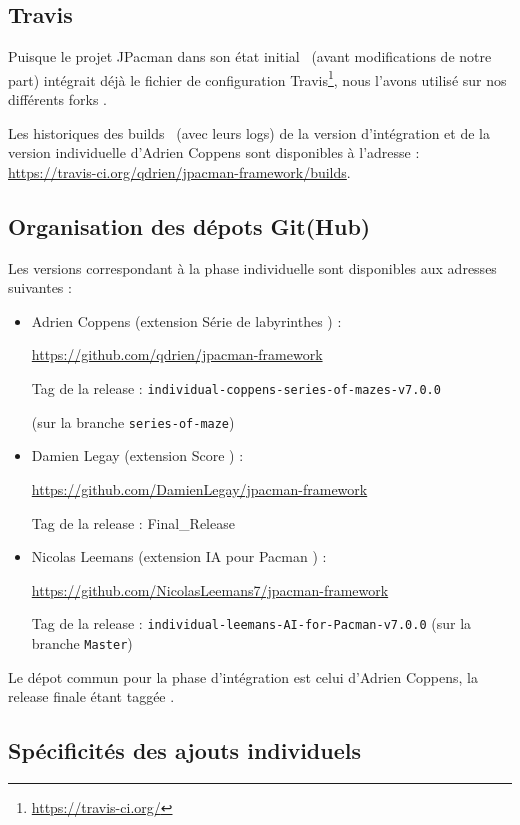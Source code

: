 \documentclass[12pt, openany]{report}
\begin{document}
\subsection{Travis}
Puisque le projet JPacman dans son état \og initial \fg \, (avant modifications de notre part) intégrait déjà le fichier de configuration Travis\footnote{\url{https://travis-ci.org/}}, nous l'avons utilisé sur nos différents \og forks \fg .

Les historiques des \og builds \fg \, (avec leurs logs) de la version d'intégration et de la version individuelle d'Adrien Coppens sont disponibles à l'adresse : \url{https://travis-ci.org/qdrien/jpacman-framework/builds}.

\subsection{Organisation des dépots Git(Hub)}
Les versions correspondant à la phase individuelle sont disponibles aux adresses suivantes :
\begin{itemize}
	\item Adrien Coppens (extension \og Série de labyrinthes \fg ) : 
	
	\url{https://github.com/qdrien/jpacman-framework}
	
	Tag de la release : \nolinkurl{individual-coppens-series-of-mazes-v7.0.0}
	
	(sur la branche \nolinkurl{series-of-maze})
	\item Damien Legay (extension \og Score \fg ) : 
	
	\url{https://github.com/DamienLegay/jpacman-framework}
	
	Tag de la release : \nolinkurl{}{Final\_Release}
	\item Nicolas Leemans (extension \og IA pour Pacman \fg ) : 
	
	\url{https://github.com/NicolasLeemans7/jpacman-framework}
	
	Tag de la release : \nolinkurl{individual-leemans-AI-for-Pacman-v7.0.0}
	(sur la branche \nolinkurl{Master})
\end{itemize}

Le dépot commun pour la phase d'intégration est celui d'Adrien Coppens, la release finale étant taggée \nolinkurl{}. %



\subsection{Spécificités des ajouts individuels}
\end{document}
